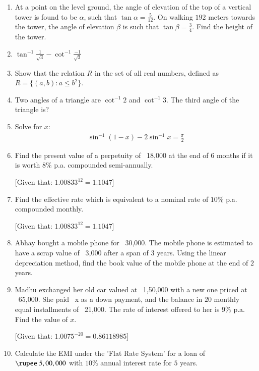 \documentclass{article}
\theoremstyle{remark}
\begin{document}
\begin{enumerate}
    \item At a point on the level ground, the angle of elevation of the top of a vertical tower is found to be $\alpha$, such that $\tan\alpha = \frac{5}{12}$. On walking $192$ meters towards the tower, the angle of elevation $\beta$ is such that $\tan\beta = \frac{3}{4}$. Find the height of the tower.
    
    \item $\tan^{-1}\frac{1}{\sqrt{3}} - \cot^{-1}\frac{-1}{\sqrt{3}}$
    
    \item Show that the relation $R$ in the set of all real numbers, defined as $R = \{(a,b) : a \leq b^2\}$.
    
    \item Two angles of a triangle are $\cot^{-1}2$ and $\cot^{-1}3$. The third angle of the triangle is?
    
    \item Solve for $x$:
    \begin{align}
        \sin^{-1}(1-x) - 2 \sin^{-1} x = \frac{\pi}{2}
    \end{align}
    \item Find the present value of a perpetuity of \rupee~18,000 at the end of $6$ months if it is worth $8\%$ p.a. compounded semi-annually.
    
    [Given that: $1.00833^{12} = 1.1047$]
    
    \item Find the effective rate which is equivalent to a nominal rate of $10\%$ p.a. compounded monthly.
    
    [Given that: $1.00833^{12} = 1.1047$]
    
    \item Abhay bought a mobile phone for \rupee~30,000. The mobile phone is estimated to have a scrap value of \rupee~3,000 after a span of $3$ years. Using the linear depreciation method, find the book value of the mobile phone at the end of $2$ years.
    
    \item Madhu exchanged her old car valued at \rupee~1,50,000 with a new one priced at \rupee~65,000. She paid \rupee~x as a down payment, and the balance in $20$ monthly equal installments of \rupee~21,000. The rate of interest offered to her is $9\%$ p.a. Find the value of $x$.
    
    [Given that: $1.0075^{-20} = 0.86118985$]
    
    \item Calculate the EMI under the 'Flat Rate System' for a loan of $\rupee~5,00,000$ with $10\%$ annual interest rate for $5$ years.
    

\end{enumerate}
\end{document}
